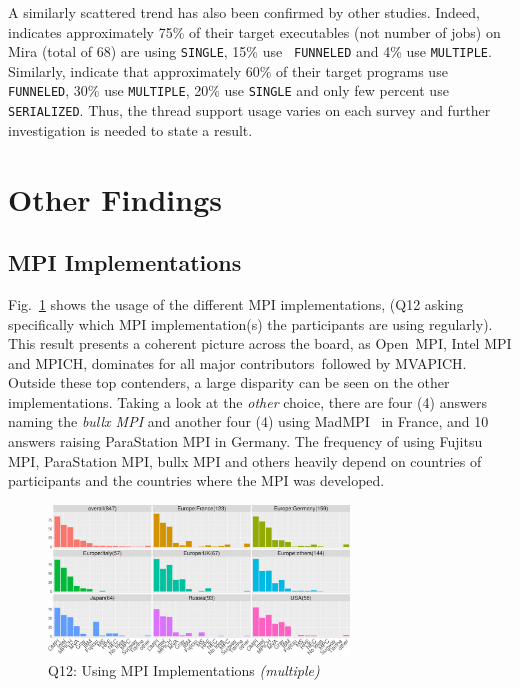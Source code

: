 \documentclass[preprint,5p,times]{elsarticle}
\def\myquote#1{{\it #1}}
\newcommand{\revision}[2]{{\color{blue}#2}}
\def\mcountries{major contributors\xspace{}}%
\begin{document}
A similarly scattered trend has also been confirmed by other studies. Indeed,
\cite{8665758} indicates approximately 75\% of their target executables (not
number of jobs) on Mira (total of 68) are using {\tt SINGLE}, 15\% use {\tt
FUNNELED} and 4\% use {\tt MULTIPLE}. Similarly, \cite{10.1145/3295500.3356176}
indicate that approximately 60\% of their target programs use {\tt FUNNELED},
30\% use {\tt MULTIPLE}, 20\% use {\tt SINGLE} and only few percent use {\tt
SERIALIZED}. Thus, the thread support usage varies on each survey and further
investigation is needed to state a result.

\section{Other Findings}

\subsection{MPI Implementations}

 Fig.~\ref{fig:using-implementations} shows the usage of the different MPI
 implementations, (Q12 asking specifically which MPI implementation(s) the
 participants are using regularly). This result presents a coherent picture
 across the board, as Open~MPI, Intel MPI and MPICH, dominates \revision{in}{for} all
 \mcountries\ followed by MVAPICH. Outside these top contenders, a large
 disparity can be seen on the other implementations. Taking a look at the
 \myquote{other} choice, there are four (4) answers naming the \myquote{bullx
 MPI} and another four (4) using MadMPI~\cite{madmpi} in France, and 10 answers
 raising ParaStation MPI in Germany. The frequency of using Fujitsu MPI,
 ParaStation MPI, bullx MPI and others heavily depend on countries of
 participants and the countries where the MPI was developed.

  \begin{figure}[tb]
    \begin{center}
      \includegraphics[width=8.0cm]{R-scripts/Q12.pdf}
    \vspace{-2mm}
      \caption{Q12: Using MPI Implementations {\it(multiple)}}
      \label{fig:using-implementations}
    \end{center}
  \end{figure}
\end{document}
